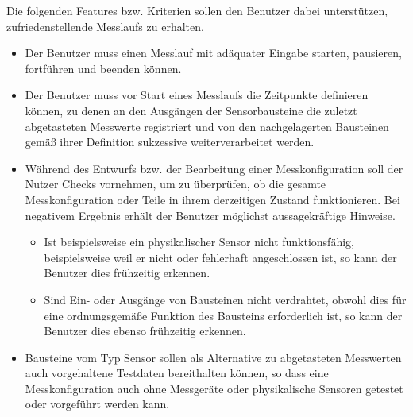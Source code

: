 \documentclass[parskip=full]{scrartcl}
\begin{document}
Die folgenden Features bzw. Kriterien sollen den Benutzer dabei unterstützen, zufriedenstellende \glspl{Messlauf} zu erhalten.


\begin{itemize}
	
	\item 
	\begin{MussKrit} 			
		Der Benutzer muss einen Messlauf mit adäquater Eingabe starten, pausieren, fortführen und beenden können. 
	\end{MussKrit}
	
	\item 
	\begin{MussKrit} 	
		Der Benutzer muss vor Start eines Messlaufs die Zeitpunkte definieren können, zu denen an den Ausgängen der Sensorbausteine die zuletzt abgetasteten Messwerte registriert und von den nachgelagerten Bausteinen gemäß ihrer Definition sukzessive weiterverarbeitet werden.		
	\end{MussKrit}
	
	\item 
	\begin{SollKrit} 
		Während des Entwurfs bzw. der Bearbeitung einer Messkonfiguration soll der Nutzer Checks vornehmen, um zu überprüfen, ob die gesamte Messkonfiguration oder Teile in ihrem derzeitigen Zustand funktionieren. Bei negativem Ergebnis erhält der Benutzer möglichst aussagekräftige Hinweise. 
 
	
		\begin{itemize}
			
			\item Ist beispielsweise ein physikalischer Sensor nicht funktionsfähig, beispielsweise weil er nicht oder fehlerhaft angeschlossen ist, so kann der Benutzer dies frühzeitig erkennen.
			
			\item Sind Ein- oder Ausgänge von Bausteinen nicht verdrahtet, obwohl dies für  eine ordnungsgemäße Funktion des Bausteins erforderlich ist, so kann der Benutzer dies ebenso frühzeitig erkennen.
			
		\end{itemize}
	\end{SollKrit}
	
	
	\item 
	\begin{WunschKrit} 			
		Bausteine vom Typ Sensor sollen als Alternative zu abgetasteten Messwerten auch vorgehaltene Testdaten bereithalten können, so dass eine Messkonfiguration auch ohne Messgeräte oder physikalische Sensoren getestet oder vorgeführt werden kann.
	\end{WunschKrit}	
	

\end{itemize}
\end{document}

